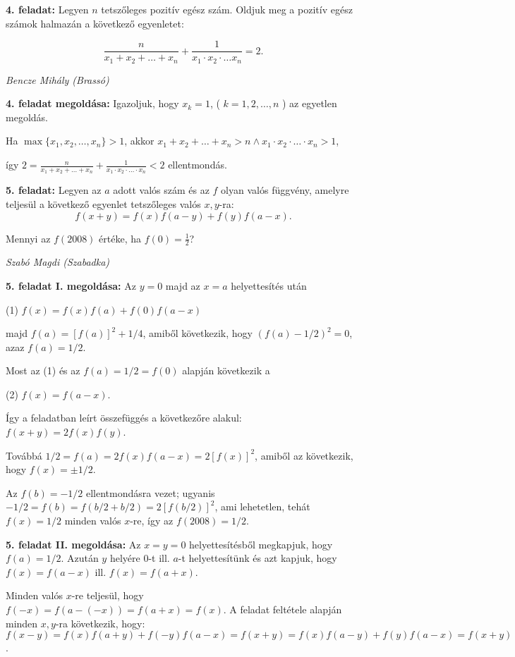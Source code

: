 \documentclass[a4paper,10pt]{article}
\def\ki#1#2{\hfill {\it #1 (#2)}\medskip}
\begin{document}
\medskip
{\bf 4. feladat: } Legyen $n$ tetszőleges pozitív egész szám. Oldjuk meg a pozitív egész számok halmazán a  következő egyenletet:

$$\frac{n}{x_1+x_2+\dots+x_n} + \frac{1}{x_1\cdot x_2 \cdot \dots x_n} = 2. $$

\ki{Bencze Mihály}{Brassó}\medskip



{\bf 4. feladat megoldása: } Igazoljuk, hogy $x_k =1$, ( $k = 1,2,\dots, n$ ) az egyetlen megoldás. 

Ha $\max\{x_1, x_2,\dots, x_n\}>1$, akkor $x_1+x_2+\dots+x_n>n \land x_1\cdot x_2\cdot \dots \cdot x_n>1$,

így $2=\frac{n}{x_1+x_2+\dots+x_n}+\frac{1}{x_1\cdot x_2\cdot \dots \cdot x_n}<2$
ellentmondás.


\medskip
{\bf 5. feladat: } Legyen az  $a$  adott valós szám és az  $f$ olyan valós függvény, amelyre teljesül a következő egyenlet tetszőleges valós $x, y$-ra:
$$f(x+y)=f(x)f(a-y)+f(y)f(a-x).$$

Mennyi az $f(2008)$ értéke, ha $f(0)=\frac{1}{2}$?

\ki{Szabó Magdi}{Szabadka}\medskip


{\bf 5. feladat I. megoldása: } Az $y = 0$ majd az $x = a$ helyettesítés után

(1) $f(x)=f(x)f(a)+f(0)f(a-x)$

majd $f(a)=[f(a)]^2 +1/4$,
amiből következik, hogy $(f(a)-1/2)^2 =0$, azaz $f(a) =1/2$.

Most az (1) és az $f(a) = 1/2 = f(0)$ alapján következik a

(2) $f(x) = f(a-x)$.

Így a feladatban leírt összefüggés a következőre alakul: $f(x+y) = 2f(x)f(y)$.

Továbbá $1/2 = f(a) =2f(x)f(a-x) = 2[f(x)]^2$, amiből az következik, hogy
$f(x)= \pm 1/2$.

Az $f(b)= -1/2$ ellentmondásra vezet; ugyanis $-1/2 = f(b) = f(b/2 +b/2)= 2[f(b/2)]^2$, 
ami lehetetlen, tehát $f(x)= 1/2$ minden valós $x$-re, így az $f(2008)=1/2$.


\medskip

{\bf 5. feladat II. megoldása: } Az $x = y = 0$ helyettesítésből megkapjuk, hogy $f(a) =1/2$.
Azután $y$ helyére $0$-t ill. $a$-t helyettesítünk és azt kapjuk, hogy
$f(x) = f(a-x)$ ill. $f(x) = f(a+x)$.

Minden valós $x$-re teljesül, hogy $f(-x) = f(a-(-x)) = f(a+x) = f(x)$.
A feladat feltétele alapján minden $x,y$-ra következik, hogy:
$f(x-y) = f(x) f(a+y) + f(-y)f(a-x) = f(x+y) = f(x) f(a-y) + f(y)f(a-x) =
f(x+y)$.
\end{document}
